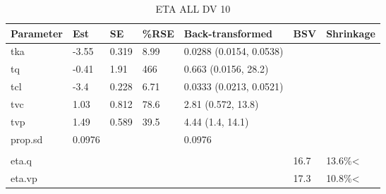 \begin{table}
\centering\centering
\caption{ETA ALL DV 10}
\centering
\fontsize{8}{10}\selectfont
\begin{tabular}[t]{lllllll}
\toprule
\textbf{Parameter} & \textbf{Est} & \textbf{SE} & \textbf{\%RSE} & \textbf{Back-transformed} & \textbf{BSV} & \textbf{Shrinkage}\\
\midrule
tka & -3.55 & 0.319 & 8.99 & 0.0288 (0.0154, 0.0538) &  & \\
\midrule
tq & -0.41 & 1.91 & 466 & 0.663 (0.0156, 28.2) &  & \\
\midrule
tcl & -3.4 & 0.228 & 6.71 & 0.0333 (0.0213, 0.0521) &  & \\
\midrule
tvc & 1.03 & 0.812 & 78.6 & 2.81 (0.572, 13.8) &  & \\
\midrule
tvp & 1.49 & 0.589 & 39.5 & 4.44 (1.4, 14.1) &  & \\
\midrule
prop.sd & 0.0976 &  &  & 0.0976 &  & \\
\midrule\\
eta.q &  &  &  &  & 16.7 & 13.6\%<\\
\midrule
eta.vp &  &  &  &  & 17.3 & 10.8\%<\\
\bottomrule
\end{tabular}
\end{table}